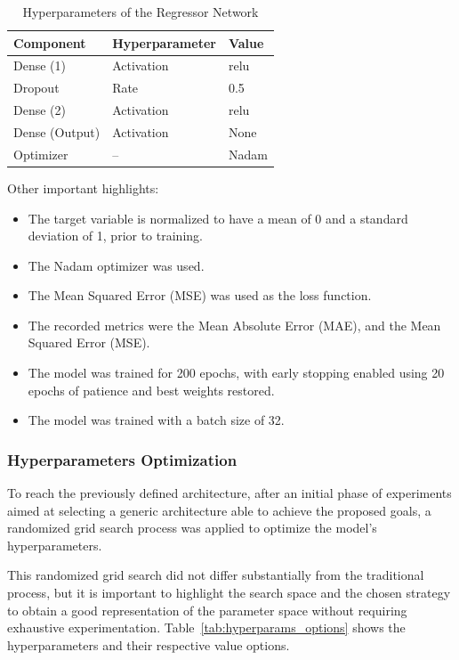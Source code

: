 \documentclass[10pt,conference]{IEEEtran}
\begin{document}
\begin{table} \small \centering
  \caption{Hyperparameters of the Regressor Network}
  \label{tab:hyperparams_regressor}
  \begin{tabular}{lll}
    \toprule
    Component & Hyperparameter & Value \\
    \midrule
    \multirow{1}{*}{Dense (1)} 
        & Activation & relu \\
    Dropout & Rate & 0.5 \\
    \multirow{1}{*}{Dense (2)} 
        & Activation & relu \\
    \multirow{1}{*}{Dense (Output)} 
        & Activation & None \\
    Optimizer & -- & Nadam \\
    \bottomrule
  \end{tabular}
\end{table}

Other important highlights:

\begin{itemize}
    \item The target variable is normalized to have a mean of 0 and a standard deviation of 1, prior to training.
    \item The Nadam optimizer was used.
    \item The Mean Squared Error (MSE) was used as the loss function.
    \item The recorded metrics were the Mean Absolute Error (MAE), and the Mean Squared Error (MSE).
    \item The model was trained for 200 epochs, with early stopping enabled using 20 epochs of patience and best weights restored.
    \item The model was trained with a batch size of 32.
\end{itemize}

\subsubsection{Hyperparameters Optimization}

To reach the previously defined architecture, after an initial phase of experiments aimed at selecting a generic architecture able to achieve the proposed goals, a randomized grid search process was applied to optimize the model’s hyperparameters.

This randomized grid search did not differ substantially from the traditional process, but it is important to highlight the search space and the chosen strategy to obtain a good representation of the parameter space without requiring exhaustive experimentation. Table~\ref{tab:hyperparams_options} shows the hyperparameters and their respective value options.
\end{document}
